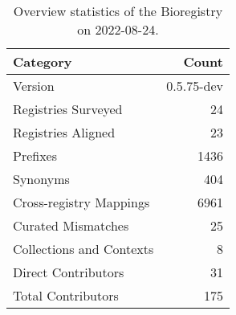 \begin{table}
\centering
\caption{Overview statistics of the Bioregistry on 2022-08-24.}
\label{tab:bioregistry-summary}
\begin{tabular}{lr}
\toprule
                Category &      Count \\
\midrule
                 Version & 0.5.75-dev \\
     Registries Surveyed &         24 \\
      Registries Aligned &         23 \\
                Prefixes &       1436 \\
                Synonyms &        404 \\
 Cross-registry Mappings &       6961 \\
      Curated Mismatches &         25 \\
Collections and Contexts &          8 \\
     Direct Contributors &         31 \\
      Total Contributors &        175 \\
\bottomrule
\end{tabular}
\end{table}
